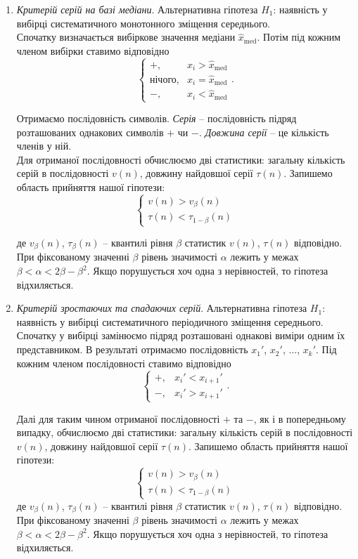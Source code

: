 \begin{enumerate}
	\item \textit{Критерій серій на базі медіани}. Альтернативна гіпотеза $H_1$: наявність у вибірці систематичного монотонного зміщення середнього. \\

	Спочатку визначається вибіркове значення медіани $\widehat{x}_{\text{med}}$. Потім під кожним членом вибірки ставимо відповідно \[ \begin{cases} +, & x_i > \widehat{x}_{\text{med}} \\ \text{нічого}, & x_i = \widehat{x}_{\text{med}} \\ -, & x_i < \widehat{x}_{\text{med}} \end{cases}. \]

	Отримаємо послідовність символів. \textit{Серія} -- послідовність підряд розташованих однакових символів $+$ чи $-$. \textit{Довжина серії} -- це кількість членів у ній. \\

	Для отриманої послідовності обчислюємо дві статистики: загальну кількість серій в послідовності $v(n)$, довжину найдовшої серії $\tau(n)$. Запишемо область прийняття нашої гіпотези: \[ \left\{ \begin{matrix} v(n) > v_\beta(n) \\ \tau(n) < \tau_{1-\beta}(n) \end{matrix} \right. \] 

	де $v_\beta(n)$, $\tau_\beta(n)$ -- квантилі рівня $\beta$ статистик $v(n)$, $\tau(n)$ відповідно. При фіксованому значенні $\beta$ рівень значимості $\alpha$ лежить у межах $\beta < \alpha < 2\beta - \beta^2$. Якщо порушується хоч одна з нерівностей, то гіпотеза відхиляється.

	\item \textit{Критерій зростаючих та спадаючих серій}. Альтернативна гіпотеза $H_1$: наявність у вибірці систематичного періодичного зміщення середнього. Спочатку у вибірці замінюємо підряд розташовані однакові виміри одним їх представником. В результаті отримаємо послідовність $x_1'$, $x_2'$, $\ldots$, $x_k'$. Під кожним членом послідовності ставимо відповідно \[ \begin{cases} +, & x_i' < x_{i+1}' \\ -, & x_i' > x_{i+1}' \end{cases}. \]

	Далі для таким чином отриманої послідовності $+$ та $-$, як і в попередньому випадку, обчислюємо дві статистики: загальну кількість серій в послідовності $v(n)$, довжину найдовшої серії $\tau(n)$. Запишемо область прийняття нашої гіпотези: \[ \left\{ \begin{matrix} v(n) > v_\beta(n) \\ \tau(n) < \tau_{1-\beta}(n) \end{matrix} \right. \] де $v_\beta(n)$, $\tau_\beta(n)$ -- квантилі рівня $\beta$ статистик $v(n)$, $\tau(n)$ відповідно. При фіксованому значенні $\beta$ рівень значимості $\alpha$ лежить у межах $\beta < \alpha < 2\beta - \beta^2$. Якщо порушується хоч одна з нерівностей, то гіпотеза відхиляється.


\end{enumerate}
